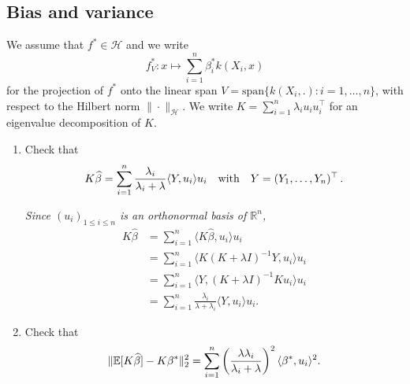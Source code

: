 \documentclass[a4paper,10pt,fleqn]{article}
\newcommand{\R}{\ensuremath{\mathbb{R}}}
\newcommand{\E}{\ensuremath{\mathbb{E}}}
\newcommand{\1}{\ensuremath{\mathbbm{1}}}
\begin{document}
\subsection{Bias and variance}
We assume that $f^*\in\mathcal{H}$ and we write 
$$f^*_{V}: x \mapsto \sum_{i=1}^n \beta_{i}^*k(X_{i},x)$$ 
for the projection of $f^*$ onto the linear span $V=\textrm{span}\{k(X_{i},.): i=1,\ldots,n\}$, with respect to the Hilbert norm $\|\cdot\|_{\mathcal{H}}$. We write $K=\sum_{i=1}^n \lambda_{i}u_{i}u_{i}^\top$ for an eigenvalue decomposition of $K$.
\begin{enumerate}
	\item Check that 
	$$K\widehat \beta= \sum_{i=1}^n {\lambda_{i}\over \lambda_{i}+\lambda} \langle Y, u_{i}\rangle u_{i}\quad\textrm{with}\quad Y=(Y_{1},\ldots,Y_{n})^\top\,.$$

\vspace{.2cm}

{\em
Since $(u_i)_{1 \leq i \leq n}$ is an orthonormal basis of $\R^n$,   
		\begin{align*}
			K \widehat{\beta} & = \sum_{i=1}^n \langle K \widehat{\beta}, u_i\rangle u_i\\
			& = \sum_{i=1}^n \langle K (K+\lambda I)^{-1}Y, u_i\rangle u_i\\
			& = \sum_{i=1}^n \langle Y, (K+\lambda I)^{-1} K  u_i\rangle u_i\\
			& = \sum_{i=1}^n \frac{\lambda_i }{\lambda + \lambda_i} \langle Y, u_i \rangle u_i.
		\end{align*}
}
	\item Check that
	$$\|\E[K\widehat \beta]-K\beta^*\|_2^2=\sum_{i=1}^n \left( \lambda\lambda_{i}\over \lambda_{i}+\lambda\right)^2 \langle \beta^*, u_{i}\rangle^2.$$

\vspace{.2cm}


\end{enumerate}
\end{document}
